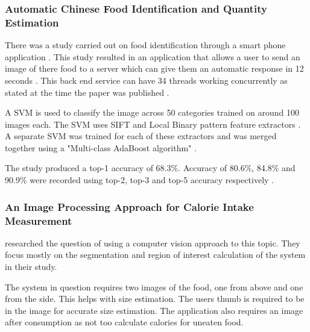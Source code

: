 
\subsubsection*{Automatic Chinese Food Identification and Quantity Estimation}
There was a study carried out on food identification through a smart phone application \textcite{chen2012automatic}. This study resulted in an application that allows a user to send an image of there food to a server which can give them an automatic response in 12 seconds \textcite{chen2012automatic}. This back end service can have 34 threads working concurrently as stated at the time the paper was published \textcite{chen2012automatic}.

A SVM is used to classify the image across 50 categories trained on around 100 images each.
The SVM uses SIFT and Local Binary pattern feature extractors \textcite{chen2012automatic}.
A separate SVM was trained for each of these extractors and was merged together using a "Multi-class AdaBoost algorithm" \textcite{chen2012automatic}.

The study produced a top-1 accuracy  of 68.3\%. Accuracy of 80.6\%, 84.8\% and 90.9\% were recorded using top-2, top-3 and top-5 accuracy respectively \textcite{chen2012automatic}. 


\subsubsection*{An Image Processing Approach for Calorie Intake Measurement}
\textcite{villalobos2012image} researched the question of using a computer vision approach to this topic. They focus mostly on the segmentation and region of interest calculation of the system in their study.

The system in question requires two images of the food, one from above and one from the side. This helps with size estimation. The users thumb is required to be in the image for accurate size estimation. The application also requires an image after consumption as not too calculate calories for uneaten food.

